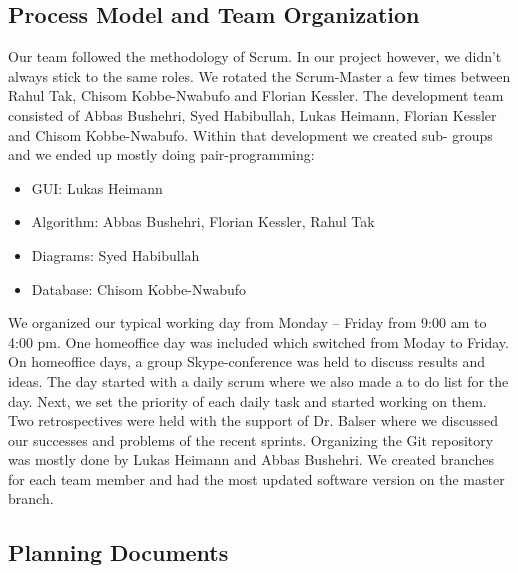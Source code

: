 \documentclass[12pt, a4paper]{article}
\begin{document}
\subsection{Process Model and Team Organization}
Our team followed the methodology of Scrum. In our project however, we didn't always stick to the same roles. We rotated the Scrum-Master a few times between Rahul Tak, Chisom Kobbe-Nwabufo and Florian Kessler. The development team consisted of Abbas Bushehri, Syed Habibullah, Lukas Heimann, Florian Kessler and Chisom Kobbe-Nwabufo. Within that development we created sub- groups and we ended up mostly doing pair-programming:
\begin{itemize}
\item GUI: Lukas Heimann
\item Algorithm: Abbas Bushehri, Florian Kessler, Rahul Tak
\item Diagrams: Syed Habibullah
\item Database: Chisom Kobbe-Nwabufo
\end{itemize}
We organized our typical working day from Monday – Friday from 9:00 am to 4:00 pm. One homeoffice day was included which switched from Moday to Friday. On homeoffice days, a group Skype-conference was held to discuss results and ideas. The day started with a daily scrum where we also made a to do list for the day. Next, we set the priority of each daily task and started working on them. Two retrospectives were held with the support of Dr. Balser where we discussed our successes and problems of the recent sprints. Organizing the Git repository was mostly done by Lukas Heimann and Abbas Bushehri. We created branches for each team member and had the most updated software version on the master branch.

\subsection{Planning Documents}
\end{document}

